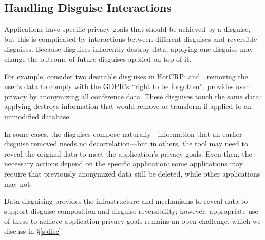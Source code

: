 \subsection{Handling Disguise Interactions}

Applications have specific privacy goals that should be achieved by a disguise,
but this is complicated by interactions between different disguises and reversible disguises.
%
Because disguises inherently destroy data, applying one disguise may change the outcome of future
disguises applied on top of it.

For example, consider two desirable disguises in HotCRP: \gdpr and \ca.
%
\gdpr removing the user's data to comply with the GDPR's ``right to be forgotten''; \ca provides
user privacy by anonymizing all conference data.
%
These disguises touch the same data: applying \ca destroys information that \gdpr would remove
or transform if applied to an unmodified database.
%

%
In some cases, the disguises compose naturally---\eg information that an earlier disguise removed
needs no decorrelation---but in others, the tool may need to reveal the original data to meet the
application's privacy goals. Even then, the necessary actions depend on the specific application:
some applications may require that previously anonymized data still be deleted, while other
applications may not.
%

Data disguising provides the infrastructure and mechanisms to reveal data to support
disguise composition and disguise reversibility; however, appropriate use of these to
achieve application privacy goals remains an open challenge, which we discuss in \S\ref{s:disc}.


